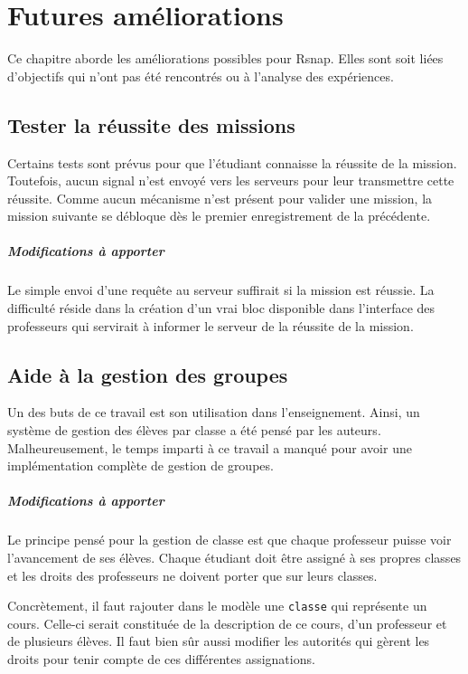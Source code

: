﻿\chapter{Futures améliorations}
Ce chapitre aborde les améliorations possibles pour Rsnap. Elles sont soit liées d'objectifs qui n'ont pas été rencontrés ou à l'analyse des expériences.

\section{Tester la réussite des missions}
Certains tests sont prévus pour que l'étudiant connaisse la réussite de la mission. Toutefois, aucun signal n'est envoyé vers les serveurs pour leur transmettre cette réussite. Comme aucun mécanisme n'est présent pour valider une mission, la mission suivante se débloque dès le premier enregistrement de la précédente.

\paragraph{Modifications à apporter}
Le simple envoi d'une requête au serveur suffirait si la mission est réussie. La difficulté réside dans la création d'un vrai bloc disponible dans l'interface des professeurs qui servirait à informer le serveur de la réussite de la mission.

\section{Aide à la gestion des groupes}
Un des buts de ce travail est son utilisation dans l'enseignement. Ainsi, un système de gestion des élèves par classe a été pensé par les auteurs. Malheureusement, le temps imparti à ce travail a manqué pour avoir une implémentation complète de gestion de groupes.

\paragraph{Modifications à apporter}
Le principe pensé pour la gestion de classe est que chaque professeur puisse voir l'avancement de ses élèves. Chaque étudiant doit être assigné à ses propres classes et les droits des professeurs ne doivent porter que sur leurs classes.

Concrètement, il faut rajouter dans le modèle une \texttt{classe} qui représente un cours. Celle-ci serait constituée de la description de ce cours, d'un professeur et de plusieurs élèves. Il faut bien sûr aussi modifier les autorités qui gèrent les droits pour tenir compte de ces différentes assignations.

